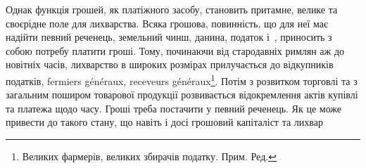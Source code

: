 Однак функція грошей, як платіжного засобу, становить притамне, велике
та своєрідне поле для лихварства. Всяка грошова, повинність, що для неї має
надійти певний реченець, земельний чинш, данина, податок і~, приносить
з собою потребу платити гроші. Тому, починаючи від стародавніх римлян аж
до новітніх часів, лихварство в широких розмірах прилучається до відкупників
податків, fermiers généraux, receveurs généraux\footnote*{
Великих фармерів, великих збирачів податку. Прим. Ред.
}. Потім з розвитком торговлі та
з загальним поширом товарової продукції розвивається відокремлення актів купівлі
та платежа щодо часу. Гроші треба постачити у певний реченець. Як це може
привести до такого стану, що навіть і досі грошовий капіталіст та лихвар
\parbreak{}  %
